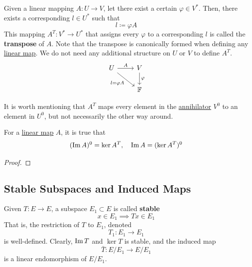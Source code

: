   \begin{definition}[Transpose]
    \label{def:transpose}
    Given a linear mapping $A: U \to V$, let there exist a certain $\varphi \in V^\ast$. Then, there exists a corresponding $l \in U^\ast$ such that 
    \begin{equation}
      l \coloneqq \varphi A
    \end{equation}
    This mapping $A^T: V^\ast \to U^\ast$ that assigns every $\varphi$ to a corresponding $l$ is called the \textbf{transpose} of $A$. Note that the transpose is canonically formed when defining any \hyperref[def:linear_map]{linear map}. We do not need any additional structure on $U$ or $V$ to define $A^T$.
    \begin{equation}
      \begin{tikzcd}
        U \arrow{r}{A} \arrow[swap]{dr}{l = \varphi A} & V \arrow{d}{\varphi} \\
        & \mathbb{F}
      \end{tikzcd}
    \end{equation}
  \end{definition}

  It is worth mentioning that $A^T$ maps every element in the \hyperref[def:annihilator]{annihilator} $V^0$ to an element in $U^0$, but not necessarily the other way around. 

	\begin{theorem}
	  \label{thm:annihilator-of-image-is-the-kernel-of-the}
    For a \hyperref[def:linear_map]{linear map} $A$, it is true that
    \begin{equation}
      (\operatorname{Im} A)^0 = \ker A^T, \quad  \operatorname{Im} A = (\ker A^T)^0
    \end{equation}
  \end{theorem}
	\begin{proof}
	  
	\end{proof}

\subsection{Stable Subspaces and Induced Maps}

  \begin{definition}
    \label{def:stable-subspaces}
    Given $T: E \to E$, a subspace $E_1 \subset E$ is called \textbf{stable} 
    \begin{equation}
      x \in E_1 \implies T x \in E_1
    \end{equation}
    That is, the restriction of $T$ to $E_1$, denoted
    \begin{equation}
      T_1: E_1 \to E_1
    \end{equation}
    is well-defined. Clearly, $\operatorname{Im}{T}$ and $\ker{T}$ is stable, and the induced map 
    \begin{equation}
      \bar{T}: E / E_1 \to E / E_1
    \end{equation}
    is a linear endomorphism of $E / E_1$. 
  \end{definition}


